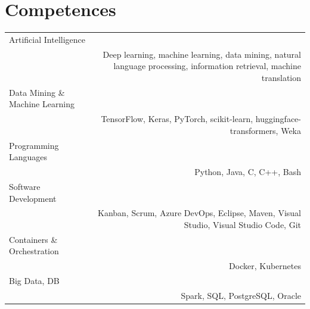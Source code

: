 \documentclass[10pt]{article}
\begin{document}
\section*{Competences}
\begin{tabular}{L!{\VRule}R}
Artificial Intelligence\\&Deep learning, machine learning, data mining, natural language processing, information retrieval, machine translation\\
Data Mining \& Machine Learning\\&TensorFlow, Keras, PyTorch, scikit-learn, huggingface-transformers, Weka\\
Programming Languages\\&Python, Java, C, C++, Bash\\
Software Development\\&Kanban, Scrum, Azure DevOps, Eclipse, Maven, Visual Studio, Visual Studio Code, Git\\
Containers \& Orchestration\\ & Docker, Kubernetes\\
Big Data, DB\\& Spark, SQL, PostgreSQL, Oracle\\
\end{tabular}
\end{document}
